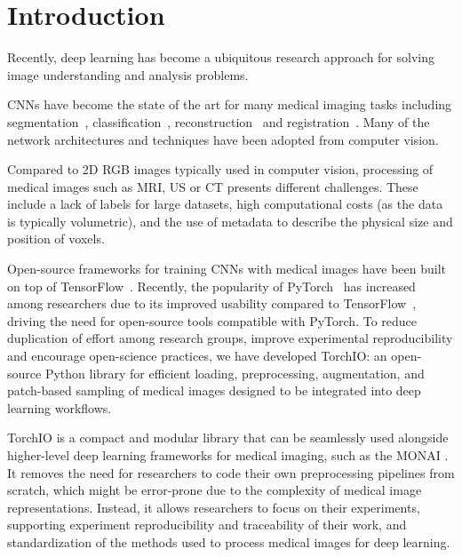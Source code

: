 \section{Introduction}

Recently, deep learning has become a ubiquitous research approach for solving image understanding and analysis problems.

\Acp{CNN} have become the state of the art for many medical imaging tasks including segmentation~\cite{cicek_3d_2016}, classification~\cite{lu_multimodal_2018}, reconstruction~\cite{chen_variable-density_2018} and registration~\cite{shan_unsupervised_2018}.
Many of the network architectures and techniques have been adopted from computer vision.

Compared to 2D \ac{RGB} images typically used in computer vision, processing of medical images such as \ac{MRI}, \ac{US} or \ac{CT} presents different challenges.
These include a lack of labels for large datasets, high computational costs (as the data is typically volumetric), and the use of metadata to describe the physical size and position of voxels.

Open-source frameworks for training \acp{CNN} with medical images have been built on top of TensorFlow~\cite{abadi_tensorflow_2016,pawlowski_dltk_2017,gibson_niftynet_2018}.
Recently, the popularity of PyTorch~\cite{paszke_pytorch_2019} has increased among researchers due to its improved usability compared to TensorFlow~\cite{he_state_2019}, driving the need for open-source tools compatible with PyTorch.
To reduce duplication of effort among research groups, improve experimental reproducibility and encourage open-science practices, we have developed TorchIO: an open-source Python library for efficient loading, preprocessing, augmentation, and patch-based sampling of medical images designed to be integrated into deep learning workflows.

TorchIO is a compact and modular library that can be seamlessly used alongside higher-level deep learning frameworks for medical imaging, such as the \ac{MONAI} \cite{cardoso_monai_2022}.
It removes the need for researchers to code their own preprocessing pipelines from scratch, which might be error-prone due to the complexity of medical image representations.
Instead, it allows researchers to focus on their experiments, supporting experiment reproducibility and traceability of their work, and standardization of the methods used to process medical images for deep learning.
